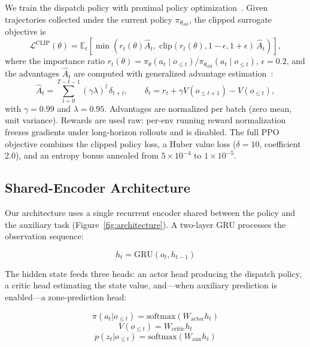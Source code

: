 \documentclass{IEEEcsmag}
\begin{document}
We train the dispatch policy with proximal policy
optimization~\cite{schulman2017ppo}. Given trajectories collected
under the current policy $\pi_{\theta_{\mathrm{old}}}$, the clipped
surrogate objective is
\begin{equation}
\mathcal{L}^{\mathrm{CLIP}}(\theta) = \mathbb{E}_t\!\left[
\min\!\left( r_t(\theta)\hat{A}_t,\;
\mathrm{clip}(r_t(\theta), 1-\epsilon, 1+\epsilon)\,\hat{A}_t
\right) \right],
\end{equation}
where the importance ratio $r_t(\theta) =
\pi_\theta(a_t \mid o_{\le t}) / \pi_{\theta_{\mathrm{old}}}(a_t \mid
o_{\le t})$, $\epsilon = 0.2$, and the advantages $\hat{A}_t$ are
computed with generalized advantage estimation~\cite{schulman2016gae}:
\begin{equation}
\hat{A}_t = \sum_{l=0}^{T-t-1} (\gamma \lambda)^l\, \delta_{t+l},
\qquad
\delta_t = r_t + \gamma V(o_{\le t+1}) - V(o_{\le t}),
\end{equation}
with $\gamma = 0.99$ and $\lambda = 0.95$. Advantages are normalized
per batch (zero mean, unit variance). Rewards are used raw: per-env
running reward normalization freezes gradients under long-horizon
rollouts and is disabled. The full PPO objective
combines the clipped policy loss, a Huber value loss ($\delta = 10$,
coefficient 2.0), and an entropy bonus annealed from
$5 \times 10^{-4}$ to $1 \times 10^{-5}$.

\subsection{Shared-Encoder Architecture}

Our architecture uses a single recurrent encoder shared between the
policy and the auxiliary task (Figure~\ref{fig:architecture}).
A two-layer GRU processes the observation sequence:

\begin{equation}
h_t = \text{GRU}(o_t, h_{t-1})
\end{equation}

The hidden state feeds three heads: an actor head producing the
dispatch policy, a critic head estimating the state value, and---when
auxiliary prediction is enabled---a zone-prediction head:

\begin{equation}
\pi(a_t | o_{\le t}) = \text{softmax}(W_{\text{actor}} h_t)
\end{equation}
\begin{equation}
V(o_{\le t}) = W_{\text{critic}} h_t
\end{equation}
\begin{equation}
p(z_t | o_{\le t}) = \text{softmax}(W_{\text{aux}} h_t)
\end{equation}
\end{document}
